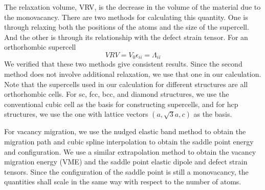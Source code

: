 \documentclass[%
 reprint,
 nofootinbib,
 amsmath,amssymb,
 aps,
]{revtex4-1}
\begin{document}
The relaxation volume, VRV, is the decrease in the volume of the material due to the monovacancy.
There are two methods for calculating this quantity.
One is through relaxing both the positions of the atoms and the size of the supercell.
And the other is through its relationship with the defect strain tensor.
For an orthorhombic supercell
\begin{equation}
  \label{eq:VRV}
  \mathit{VRV} = V_0\epsilon_{ii} = \Lambda_{ii}
\end{equation}
We verified that these two methods give consistent results.
Since the second method does not involve additional relaxation, we use that one in our calculation.
Note that the supercells used in our calculation for different structures are all orthorhombic cells.
For sc, fcc, bcc, and diamond structures, we use the conventional cubic cell as the basis for constructing supercells, and for hcp structures, we use the one with lattice vectors $(a, \sqrt{3}a, c)$ as the basis.

For vacancy migration, we use the nudged elastic band method to obtain the migration path and cubic spline interpolation to obtain the saddle point energy and configuration.
We use a similar extrapolation method to obtain the vacancy migration energy (VME) and the saddle point elastic dipole and defect strain tensors.
Since the configuration of the saddle point is still a monovacancy, the quantities shall scale in the same way with respect to the number of atoms.
\end{document}
